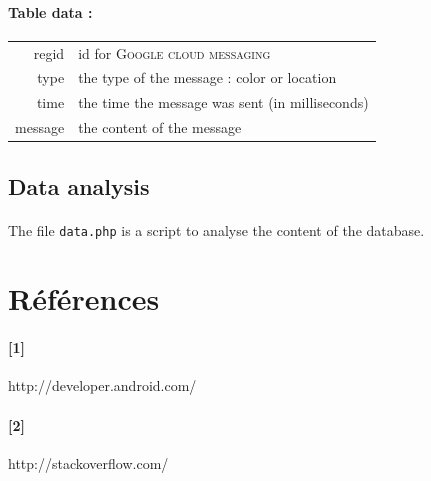 \documentclass[12pt]{article}
\begin{document}
\paragraph{Table data :}
\begin{tabular}{r|l}
regid & id for \textsc{Google cloud messaging} \\
type & the type of the message : color or location \\
time & the time the message was sent (in milliseconds) \\
message & the content of the message \\
\end{tabular}

\subsection{Data analysis}
\paragraph{}The file \verb?data.php? is a script to analyse the content of the database.


\newpage
\section*{Références}
\paragraph{[1]}http://developer.android.com/
\paragraph{[2]}http://stackoverflow.com/



\end{document}
